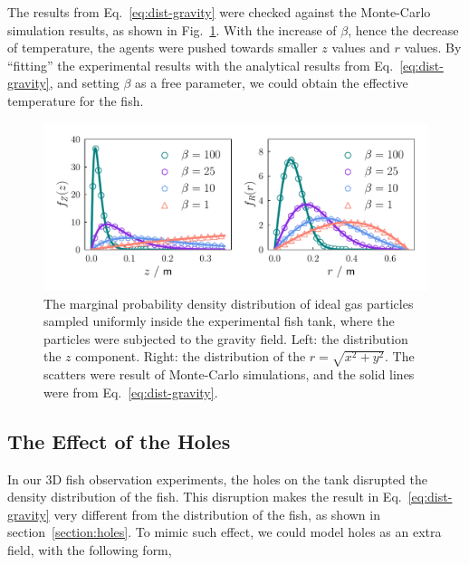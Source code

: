 \documentclass[11pt,twoside]{report}
\begin{document}
\noindent The results from Eq.~\ref{eq:dist-gravity} were checked against the Monte-Carlo simulation results, as shown in Fig.~\ref{fig:dist-gravity}. With the increase of $\beta$, hence the decrease of temperature, the agents were pushed towards smaller $z$ values and $r$ values. By ``fitting'' the experimental results with the analytical results from Eq.~\ref{eq:dist-gravity}, and setting $\beta$ as a free parameter, we could obtain the effective temperature for the fish.

\begin{figure}
  \includegraphics[width=\linewidth]{density-gravity}
  \caption[The distribution of ideal gas in the tank subjected to gravity]{The marginal probability density distribution of ideal gas particles sampled uniformly inside the experimental fish tank, where the particles were subjected to the gravity field. Left: the distribution the $z$ component. Right: the distribution of the $r = \sqrt{x^2 + y^2}$. The scatters were result of Monte-Carlo simulations, and the solid lines were from Eq.~\ref{eq:dist-gravity}.}
  \label{fig:dist-gravity}
\end{figure}


\subsection{The Effect of the Holes}
\label{section:sim-mc-holes}

In our 3D fish observation experiments, the holes on the tank disrupted the density distribution of the fish. This disruption makes the result in Eq.~\ref{eq:dist-gravity} very different from the distribution of the fish, as shown in section~\ref{section:holes}. To mimic such effect, we could model holes as an extra field, with the following form,
\end{document}
